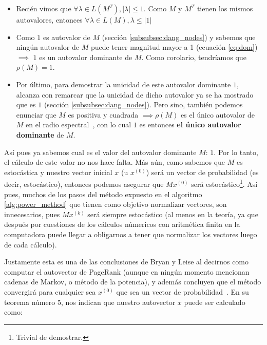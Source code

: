 \begin{itemize}
    \item Reci\'en vimos que $\forall\lambda\in L(M^T), |\lambda|\leq 1$. Como
        $M$ y $M^T$ tienen los mismos autovalores, entonces $\forall\lambda\in
        L(M), \lambda\leq\left|1\right|$\\

    \item Como $1$ es autovalor de $M$ (secci\'on \ref{subsubsec:dang_nodes}) y
        sabemos que ning\'un autovalor de $M$ puede tener magnitud mayor a 1
        (ecuaci\'on \ref{eq:dom})$\implies$ $1$ es un autovalor dominante de
        $M$.  Como corolario, tendr\'iamos que $\rho(M) = 1$.\\

    \item Por \'ultimo, para demostrar la unicidad de este autovalor dominante
        $1$, alcanza con remarcar que la unicidad de dicho autovalor ya se ha
        mostrado que es $1$ (secci\'on \ref{subsubsec:dang_nodes}). Pero sino,
        tambi\'en podemos enunciar que $M$ es positiva y cuadrada $\implies
        \rho(M)$ es el \'unico autovalor de $M$ en el radio
        espectral~\cite[p.664]{Meyer2000}, con lo cual $1$ es entonces
        \textbf{el \'unico autovalor dominante} de $M$.\\
\end{itemize}
\medskip

\par As\'i pues ya sabemos cual es el valor del autovalor dominante $M$: $1$.
Por lo tanto, el c\'alculo de este valor no nos hace falta.  M\'as a\'un, como
sabemos que $M$ es estoc\'astica y nuestro vector inicial $x$ (u $x^{(0)}$)
ser\'a un vector de probabilidad (es decir, estoc\'astico), entonces podemos
asegurar que $Mx^{(0)}$ ser\'a estoc\'astico\footnote{Trivial de demostrar.}.
As\'i pues, muchos de los pasos del m\'etodo expuesto en el algoritmo
\ref{alg:power_method} que tienen como objetivo normalizar vectores, son
innecesarios, pues $Mx^{(k)}$ ser\'a siempre estoc\'astico (al menos en la
teor\'ia, ya que despu\'es por cuestiones de los c\'alculos n\'umericos con
aritm\'etica finita en la computadora puede llegar a obligarnos a tener que
normalizar los vectores luego de cada c\'alculo).

\par Justamente esta es una de las conclusiones de Bryan y Leise al decirnos
como computar el autovector de PageRank (aunque en ning\'un momento mencionan
cadenas de Markov, o m\'etodo de la potencia), y adem\'as concluyen que el
m\'etodo convergir\'a para cualquier sea $x^{(0)}$ que sea un vector de
probabilidad~\cite[p.580]{Bryan2006}. En su teorema n\'umero 5, nos indican que
nuestro autovector $x$ puede ser calculado como:

